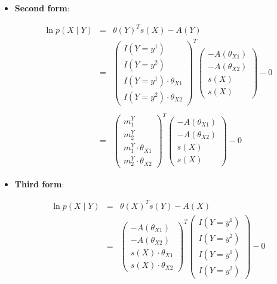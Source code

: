 \documentclass[11pt, oneside]{article}   	%
\numberwithin{figure}{section}
\numberwithin{equation}{section}
\numberwithin{table}{section}
\theoremstyle{definition}
\begin{document}
\begin{appendices}
\begin{itemize}
\item \textbf{Second form}:

\begin{eqnarray*}
\ln p(X \mid Y) &=& \theta(Y)^Ts(X) - A(Y) \\
&=&
\begin{pmatrix}
I(Y=y^1)\\
I(Y=y^2)\\
I(Y=y^1) \cdot \theta_{X1}\\
I(Y=y^2) \cdot \theta_{X2}
\end{pmatrix}^T
\begin{pmatrix}
- A(\theta_{X1}) \\
- A(\theta_{X2}) \\
s(X) \\
s(X) 
\end{pmatrix}
- 0 \\\\
&=&
\begin{pmatrix}
m^Y_1\\
m^Y_2 \\
m^Y_1 \cdot \theta_{X1}\\
m^Y_2 \cdot \theta_{X2}
\end{pmatrix}^T
\begin{pmatrix}
- A(\theta_{X1}) \\
- A(\theta_{X2}) \\
s(X) \\
s(X) 
\end{pmatrix}
- 0 
\end{eqnarray*}

\item \textbf{Third form}:

\begin{eqnarray*}
\ln p(X \mid Y) &=& \theta(X)^T s(Y) - A(X) \\
&=&
\begin{pmatrix}
- A(\theta_{X1}) \\
- A(\theta_{X2})\\
s(X) \cdot \theta_{X1}\\
s(X) \cdot \theta_{X2}
\end{pmatrix}^T
\begin{pmatrix}
I(Y=y^1) \\
I(Y=y^2) \\
I(Y=y^1) \\
I(Y=y^2)
\end{pmatrix}
- 0
\end{eqnarray*}

\end{itemize}


\end{appendices}
\end{document}
